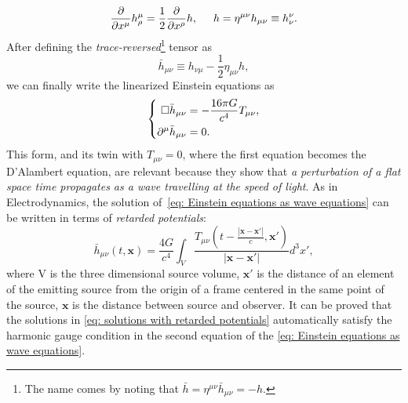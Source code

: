 \begin{equation}
    \frac{\partial}{\partial x^\mu}h^\mu_\rho = \frac{1}{2}\frac
    {\partial}{\partial x^\rho}h, \hspace{5mm} h=\eta^{\mu\nu}h_{\mu\nu}\equiv h^\nu_\nu.
\end{equation}
After defining the \textit{trace-reversed}\footnote{The name comes by noting that $\bar{h}=\eta^{\mu\nu}\bar{h}_{\mu\nu} = -h$.} tensor as
\begin{equation*}
    \bar{h}_{\mu\nu} \equiv h_{\nu\mu} - \frac{1}{2}\eta_{\mu\nu}h,
\end{equation*}
we can finally write the linearized Einstein equations as
\begin{equation}
    \left\{
        \begin{aligned}
            \square\bar{h}_{\mu\nu} &= -\frac{16\pi G}{c^4} T_{\mu\nu}, 
            \notag\\
            \partial^\mu \bar{h}_{\mu\nu} &= 0.
        \end{aligned}
    \right.
    \label{eq: Einstein equations as wave equations}
\end{equation}
This form, and its twin with $T_{\mu\nu}=0$, where the first equation becomes the D'Alambert equation, are relevant because they show that \textit{a perturbation of a flat space time propagates as a wave travelling at the speed of light}.
As in Electrodynamics, the solution of~\eqref{eq: Einstein equations as wave equations} can be written in terms of \textit{retarded potentials}:
\begin{equation}
    \bar{h}_{\mu\nu}(t,\mathbf{x}) = \frac{4G}{c^4}\int_V \frac{T_{\mu\nu}(t - \frac{|\mathbf{x} - \mathbf{x}'|}{c}, \mathbf{x}')}{|\mathbf{x} - \mathbf{x}'|}d^3x',
    \label{eq: solutions with retarded potentials}
\end{equation}
where V is the three dimensional source volume, $\mathbf{x}'$ is the distance of an element of the emitting source from the origin of a frame centered in the same point of the source, $\mathbf{x}$ is the distance between source and observer.
It can be proved that the solutions in \eqref{eq: solutions with retarded potentials} automatically satisfy the harmonic gauge condition in the second equation of the \eqref{eq: Einstein equations as wave equations}.


